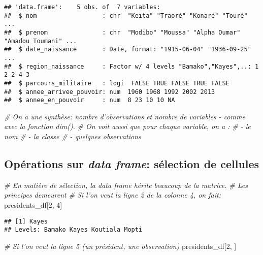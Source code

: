 \documentclass[]{book}
\newenvironment{Shaded}{\begin{snugshade}}{\end{snugshade}}
\newcommand{\DecValTok}[1]{\textcolor[rgb]{0.00,0.00,0.81}{#1}}
\newcommand{\CommentTok}[1]{\textcolor[rgb]{0.56,0.35,0.01}{\textit{#1}}}
\newcommand{\NormalTok}[1]{#1}
\begin{document}
\begin{verbatim}
## 'data.frame':    5 obs. of  7 variables:
##  $ nom                  : chr  "Keïta" "Traoré" "Konaré" "Touré" ...
##  $ prenom               : chr  "Modibo" "Moussa" "Alpha Oumar" "Amadou Toumani" ...
##  $ date_naissance       : Date, format: "1915-06-04" "1936-09-25" ...
##  $ region_naissance     : Factor w/ 4 levels "Bamako","Kayes",..: 1 2 2 4 3
##  $ parcours_militaire   : logi  FALSE TRUE FALSE TRUE FALSE
##  $ annee_arrivee_pouvoir: num  1960 1968 1992 2002 2013
##  $ annee_en_pouvoir     : num  8 23 10 10 NA
\end{verbatim}

\begin{Shaded}
\begin{Highlighting}[]
\CommentTok{# On a une synthèse: nombre d'observations et nombre de variables - comme avec la fonction dim().}
\CommentTok{# On voit aussi que pour chaque variable, on a :}
\CommentTok{# - le nom}
\CommentTok{# - la classe}
\CommentTok{# - quelques observations}
\end{Highlighting}
\end{Shaded}

\normalsize

\subsection{\texorpdfstring{Opérations sur \emph{data frame}: sélection
de
cellules}{Opérations sur data frame: sélection de cellules}}\label{operations-sur-data-frame-selection-de-cellules}

\tiny

\begin{Shaded}
\begin{Highlighting}[]
\CommentTok{# En matière de sélection, la data frame hérite beaucoup de la matrice.}
\CommentTok{# Les principes demeurent}
\CommentTok{# Si l'on veut la ligne 2 de la colonne 4, on fait:}
\NormalTok{presidents_df[}\DecValTok{2}\NormalTok{, }\DecValTok{4}\NormalTok{]}
\end{Highlighting}
\end{Shaded}

\begin{verbatim}
## [1] Kayes
## Levels: Bamako Kayes Koutiala Mopti
\end{verbatim}

\begin{Shaded}
\begin{Highlighting}[]
\CommentTok{# Si l'on veut la ligne 5 (un président, une observation)}
\NormalTok{presidents_df[}\DecValTok{2}\NormalTok{, ]}
\end{Highlighting}
\end{Shaded}
\end{document}

